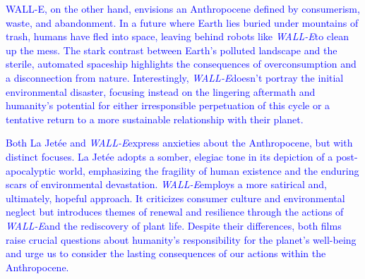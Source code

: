 \documentclass[11pt,fleqn]{book} %
\begin{document}
\begin{exercise}
\textcolor{blue}{
WALL-E, on the other hand, envisions an Anthropocene defined by consumerism, waste, and abandonment. In a future where Earth lies buried under mountains of trash, humans have fled into space, leaving behind robots like \textit{WALL-E}to clean up the mess. The stark contrast between Earth's polluted landscape and the sterile, automated spaceship highlights the consequences of overconsumption and a disconnection from nature. Interestingly, \textit{WALL-E}doesn't portray the initial environmental disaster, focusing instead on the lingering aftermath and humanity's potential for either irresponsible perpetuation of this cycle or a tentative return to a more sustainable relationship with their planet.
}

\textcolor{blue}{
Both La Jetée and \textit{WALL-E}express anxieties about the Anthropocene, but with distinct focuses. La Jetée adopts a somber, elegiac tone in its depiction of a post-apocalyptic world, emphasizing the fragility of human existence and the enduring scars of environmental devastation.  \textit{WALL-E}employs a more satirical and, ultimately, hopeful approach.  It criticizes consumer culture and environmental neglect but introduces themes of renewal and resilience through the actions of \textit{WALL-E}and the rediscovery of plant life. Despite their differences, both films raise crucial questions about humanity's responsibility for the planet's well-being and urge us to consider the lasting consequences of our actions within the Anthropocene.
}
\end{exercise}
\end{document}
